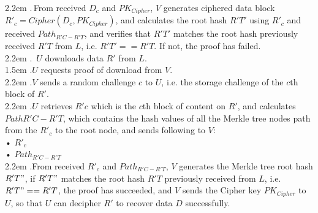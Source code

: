 \documentclass[10pt,a4paper]{article}
\begin{document}
\hangindent 2.2em
.\quad\;\,From received $D_{c}$ and $PK_{Cipher}$, $V$ generates ciphered data block $R'_{c}=Cipher(D_{c}, PK_{Cipher})$, and calculates the root hash $R'T'$ using $R'_{c}$ and received $Path_{R'C-R'T}$, and verifies that $R'T'$ matches the root hash previously received $R'T$ from $L$, i.e. $R'T' == R'T$. If not, the proof has failed.
\vspace{-0.8em}
\\

\hangindent 2.2em
.\quad  \,    $U$ downloads data $R'$ from $L$.
\vspace{-0.8em}
\\

\hangindent 1.5em
.\quad $U$ requests proof of download from $V$.
\vspace{-0.8em}
\\

\hangindent 2.2em
.\quad  $V$ sends a random challenge $c$ to $U$, i.e. the storage challenge of the $c$th block of $R'$.
\vspace{-0.8em}
\\

\hangindent 2.2em
.\quad $U$ retrieves $R'{c}$ which is the ${c}$th block of content on $R'$, and calculates $Path{R'C-R'T}$, which contains the hash values of all the Merkle tree nodes path from the $R'_{c}$ to the root node, and sends following to $V$:
\\
    •  $R'_{c}$ \\
   •  $Path_{R'C-R'T}$
    \vspace{-0.5em}
\\

\hangindent 2.2em
.\quad From received $R'_{c}$ and $Path_{R'C-R'T}$, $V$ generates the Merkle tree root hash $R'T"$, if $R'T"$ matches the root hash $R'T$ previously received from $L$, i.e. $R'T" == R'T$, the proof has succeeded, and $V$ sends the Cipher key $PK_{Cipher}$ to $U$, so that $U$ can decipher $R'$ to recover data $D$ successfully.
\vspace{-0.5em}
\end{document}
